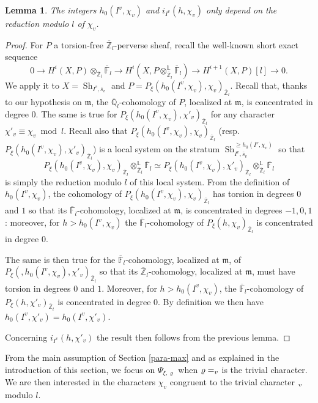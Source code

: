 \documentclass[11pt]{article}
\makeatletter
\newcommand{\resp}{resp.\xspace}
\DeclareRobustCommand{\mathbbm}[1]{\csname jepbb@#1\endcsname}
\let\mathds\mathbbm
\theoremstyle{plain}
\newtheorem{lemma}[equation]{Lemma}
\theoremstyle{definition}
\numberwithin{equation}{subsection}
\newcommand\Fm{{\mathbb F}}
\newcommand\Qm{{\mathbb Q}}
\newcommand\Zm{{\mathbb Z}}
\newcommand\Lm{{\mathbb L}}
\DeclareMathOperator{\sh}{Sh}
\makeatother
\begin{document}
\begin{lemma} \label{lem-h0I}
The integers $h_0(I^v,\chi_v)$ and $i_{I^v}(h,\chi_v)$ only depend on the reduction modulo $l$ of $\chi_v$.
\end{lemma}

\begin{proof}
For $P$ a torsion-free $\overline \Zm_l$-perverse sheaf,
recall the well-known short exact sequence
\[
0 \to H^i(X,P) \otimes_{\overline \Zm_l} \overline \Fm_l \to
H^i(X,P \otimes^\Lm_{\overline \Zm_l} \overline \Fm_l) \to
H^{i+1}(X,P)[l] \to 0.
\]
We apply it to $X=\sh_{I^v,\bar s_v}$ and $P=P_\xi(h_0(I^v,\chi_v),\chi_{v})_{\overline \Zm_l}$.
Recall that, thanks to our hypothesis on $\mathfrak m$,
the $\overline \Qm_l$-cohomology of $P$, localized at $\mathfrak m$,
is concentrated in degree $0$.
The same is true for $P_\xi(h_0(I^v,\chi_v),\chi'_{v})_{\overline \Zm_l}$ for any character
$\chi'_v \equiv \chi_v \bmod l$. Recall also that $P_\xi(h_0(I^v,\chi_v),\chi_{v})_{\overline \Zm_l}$
(\resp $P_\xi(h_0(I^v,\chi_v),\chi'_{v})_{\overline \Zm_l}$) is a local system on the stratum
$\sh_{I^v,\bar s_v}^{\geq h_0(I^v,\chi_v)}$ so that
\[
P_\xi(h_0(I^v,\chi_v),\chi_{v})_{\overline \Zm_l} \otimes^\Lm_{\overline \Zm_l} \overline \Fm_l
\simeq P_\xi(h_0(I^v,\chi_v),\chi'_{v})_{\overline \Zm_l} \otimes^\Lm_{\overline \Zm_l} \overline \Fm_l
\]
is simply the reduction modulo $l$ of this local system.
From the definition of $h_0(I^v,\chi_v)$, the cohomology of
$P_\xi(h_0(I^v,\chi_v),\chi_{v})_{\overline \Zm_l}$ has torsion in degrees $0$ and $1$
so that its $\overline \Fm_l$-cohomology, localized at $\mathfrak m$, is
concentrated in degrees $-1,0,1$: moreover, for $h> h_0(I^v,\chi_v)$ the
$\overline \Fm_l$-cohomology of $P_\xi(h,\chi_v)_{\overline \Zm_l}$ is concentrated in degree $0$.

The same is then true for the $\overline \Fm_l$-cohomology,
localized at $\mathfrak m$, of $P_\xi(,h_0(I^v,\chi_v),\chi'_{v})_{\overline \Zm_l}$
so that its $\overline \Zm_l$-cohomology, localized at $\mathfrak m$, must have
torsion in degrees $0$ and $1$. Moreover, for $h>h_0(I^v,\chi_v)$,
the $\overline \Fm_l$-cohomology of $P_\xi(h,\chi'_v)_{\overline \Zm_l}$ is concentrated
in degree $0$. By definition we then have $h_0(I^v,\chi'_v)=h_0(I^v,\chi'_v)$.

Concerning $i_{I^v}(h,\chi'_v)$ the result then follows from the previous lemma.
\end{proof}

From the main assumption of Section \ref{para-max} and as explained in the introduction of
this section, we focus on $\Psi_{\xi,\varrho}$ when $\varrho=\mathds 1_v$
is the trivial character. We are then interested in the characters $\chi_v$
congruent to the trivial character $\mathds 1_v$ modulo $l$.
\end{document}
